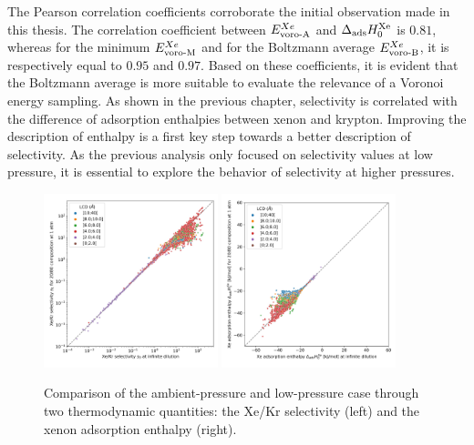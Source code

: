\documentclass[main]{subfiles}
\begin{document}
The Pearson correlation coefficients corroborate the initial observation made in this thesis. The correlation coefficient between $E_{\text{voro-A}}^{Xe}$ and $\Delta_{\text{ads}} H_{0}^{\text{Xe}}$ is $0.81$, whereas for the minimum $E_{\text{voro-M}}^{Xe}$ and for the Boltzmann average $E_{\text{voro-B}}^{Xe}$, it is respectively equal to $0.95$ and $0.97$. Based on these coefficients, it is evident that the Boltzmann average is more suitable to evaluate the relevance of a Voronoi energy sampling. As shown in the previous chapter, selectivity is correlated with the difference of adsorption enthalpies between xenon and krypton. Improving the description of enthalpy is a first key step towards a better description of selectivity. As the previous analysis only focused on selectivity values at low pressure, it is essential to explore the behavior of selectivity at higher pressures.

\begin{figure}[ht]
  \centering
  \includegraphics[width=0.45\textwidth]{figures/3-fastsim/s_0_vs_s_2080_overview.jpg}
  \includegraphics[width=0.45\textwidth]{figures/3-fastsim/H_Xe_0_vs_H_Xe_2080_overview.jpg}
    \caption{Comparison of the ambient-pressure and low-pressure case through two thermodynamic quantities: the Xe/Kr selectivity (left) and the xenon adsorption enthalpy (right). }\label{fgr:compa_pressure}
\end{figure}
\end{document}
